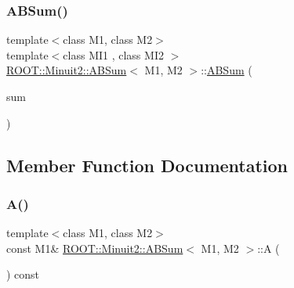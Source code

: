 \subsubsection{\texorpdfstring{ABSum()}{ABSum()}\hspace{0.1cm}{\footnotesize\ttfamily [9/9]}}
{\footnotesize\ttfamily template$<$class M1, class M2$>$ \\
template$<$class M\+I1 , class M\+I2 $>$ \\
\mbox{\hyperlink{classROOT_1_1Minuit2_1_1ABSum}{R\+O\+O\+T\+::\+Minuit2\+::\+A\+B\+Sum}}$<$ M1, M2 $>$\+::\mbox{\hyperlink{classROOT_1_1Minuit2_1_1ABSum}{A\+B\+Sum}} (\begin{DoxyParamCaption}\item[{const \mbox{\hyperlink{classROOT_1_1Minuit2_1_1ABSum}{A\+B\+Sum}}$<$ M\+I1, M\+I2 $>$ \&}]{sum }\end{DoxyParamCaption})\hspace{0.3cm}{\ttfamily [inline]}}



\subsection{Member Function Documentation}
\mbox{\label{classROOT_1_1Minuit2_1_1ABSum_a079b47b55709bd81d820c277aa389b4f}} 
\subsubsection{\texorpdfstring{A()}{A()}\hspace{0.1cm}{\footnotesize\ttfamily [1/3]}}
{\footnotesize\ttfamily template$<$class M1, class M2$>$ \\
const M1\& \mbox{\hyperlink{classROOT_1_1Minuit2_1_1ABSum}{R\+O\+O\+T\+::\+Minuit2\+::\+A\+B\+Sum}}$<$ M1, M2 $>$\+::A (\begin{DoxyParamCaption}{ }\end{DoxyParamCaption}) const\hspace{0.3cm}{\ttfamily [inline]}}

\mbox{\label{classROOT_1_1Minuit2_1_1ABSum_a079b47b55709bd81d820c277aa389b4f}} 

